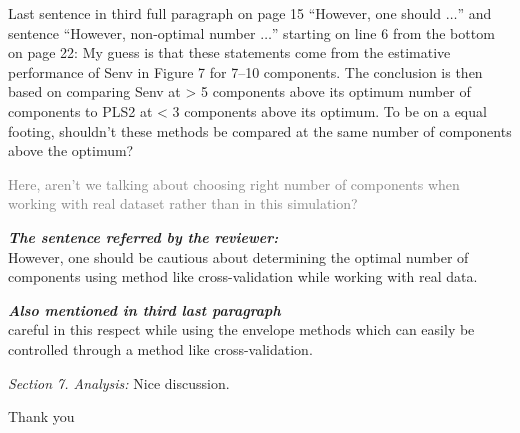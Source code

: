 \documentclass[12pt, a4paper]{scrartcl}
\begin{document}
Last sentence in third full paragraph on page 15 ``However, one should $\ldots$'' and sentence ``However, non-optimal number $\ldots$'' starting on line 6 from the bottom on page 22: My guess is that these statements come from the estimative performance of Senv in Figure 7 for 7–10 components. The conclusion is then based on comparing Senv at > 5 components above its optimum number of components to PLS2 at < 3 components above its optimum. To be on a equal footing, shouldn’t these methods be compared at the same number of components above the optimum?

\textcolor{gray}{Here, aren't we talking about choosing right number of components when working with real dataset rather than in this simulation?}

\textcolor{answers}{\textcolor{mycolor1}{\textbf{\textit{The sentence referred by the reviewer:}}} \hfill \\
However, one should be cautious about determining the optimal number of components using method like cross-validation while working with real data.}

\textcolor{answers}{\textcolor{mycolor1}{\textbf{\textit{Also mentioned in third last paragraph}}} \hfill \\
careful in this respect while using the envelope methods which can easily be controlled through a method like cross-validation.}

\textit{Section 7. Analysis:} Nice discussion.

\textcolor{answers}{Thank you}
\end{document}
